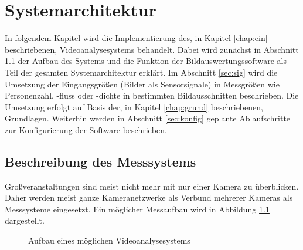 \chapter{Systemarchitektur}
\label{chap:imp}
In folgendem Kapitel wird die Implementierung des, in Kapitel \ref{chap:ein} beschriebenen, Videoanalysesystems behandelt. Dabei wird zunächst in Abschnitt \ref{sec:mess} der Aufbau des Systems und die Funktion der Bildauswertungssoftware als Teil der gesamten Systemarchitektur erklärt. Im Abschnitt \ref{sec:sig} wird die Umsetzung der Eingangsgrößen (Bilder als Sensorsignale) in Messgrößen wie Personenzahl, -fluss oder -dichte in bestimmten Bildausschnitten beschrieben. Die Umsetzung erfolgt auf Basis der, in Kapitel \ref{chap:grund} beschriebenen, Grundlagen. Weiterhin werden in Abschnitt \ref{sec:konfig} geplante Ablaufschritte zur Konfigurierung der Software beschrieben.

\section{Beschreibung des Messsystems}
\label{sec:mess}
Großveranstaltungen sind meist nicht mehr mit nur einer Kamera zu überblicken. Daher werden meist ganze Kameranetzwerke als Verbund mehrerer Kameras als Messsysteme eingesetzt. Ein möglicher Messaufbau wird in Abbildung \ref{messsystem} dargestellt.

\begin{figure}[h]
  \centering
  \caption{Aufbau eines möglichen Videoanalysesystems}
  \label{messsystem}
\end{figure}


